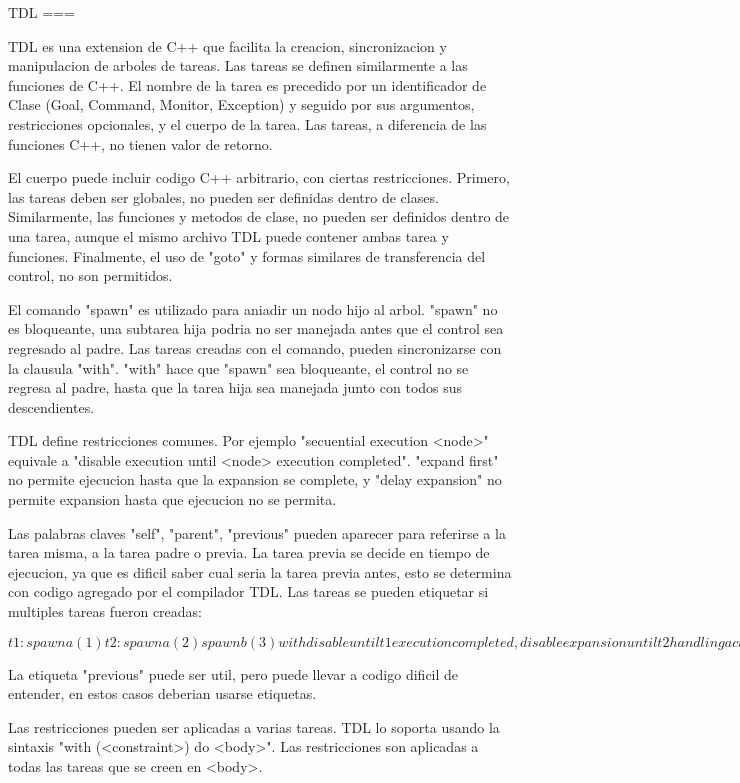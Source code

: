 TDL
===

TDL es una extension de C++ que facilita la creacion, sincronizacion y manipulacion de arboles de tareas.
Las tareas se definen similarmente a las funciones de C++.
El nombre de la tarea es precedido por un identificador de Clase (Goal, Command, Monitor, Exception) y seguido por sus argumentos,
restricciones opcionales, y el cuerpo de la tarea.
Las tareas, a diferencia de las funciones C++, no tienen valor de retorno.

El cuerpo puede incluir codigo C++ arbitrario, con ciertas restricciones.
Primero, las tareas deben ser globales, no pueden ser definidas dentro de clases. Similarmente, las funciones
y metodos de clase, no pueden ser definidos dentro de una tarea, aunque el mismo archivo TDL puede contener ambas tarea y funciones.
Finalmente, el uso de "goto" y formas similares de transferencia del control, no son permitidos.

El comando "spawn" es utilizado para aniadir un nodo hijo al arbol. "spawn" no es bloqueante, una subtarea hija podria no ser
manejada antes que el control sea regresado al padre.
Las tareas creadas con el comando, pueden sincronizarse con la clausula "with". "with" hace que "spawn" sea bloqueante,
el control no se regresa al padre, hasta que la tarea hija sea manejada junto con todos sus descendientes.

TDL define restricciones comunes. Por ejemplo "secuential execution <node>"
equivale a "disable execution until <node> execution completed".
"expand first" no permite ejecucion hasta que la expansion se complete, y 
"delay expansion" no permite expansion hasta que ejecucion no se permita.

Las palabras claves "self", "parent", "previous" pueden aparecer
para referirse a la tarea misma, a la tarea padre o previa.
La tarea previa se decide en tiempo de ejecucion, ya que es dificil
saber cual seria la tarea previa antes, esto se determina con codigo agregado
por el compilador TDL.
Las tareas se pueden etiquetar si multiples tareas fueron creadas:

$
t1: spawn a(1)
t2: spawn a(2)
spawn b(3) with
  disable until t1 execution completed,
  disable expansion until t2 handling active;
$

La etiqueta "previous" puede ser util, pero puede llevar a codigo dificil de entender, en estos casos deberian usarse etiquetas.

Las restricciones pueden ser aplicadas a varias tareas. TDL lo soporta
usando la sintaxis "with (<constraint>) do {<body>}".
Las restricciones son aplicadas a todas las tareas que se creen en <body>.

